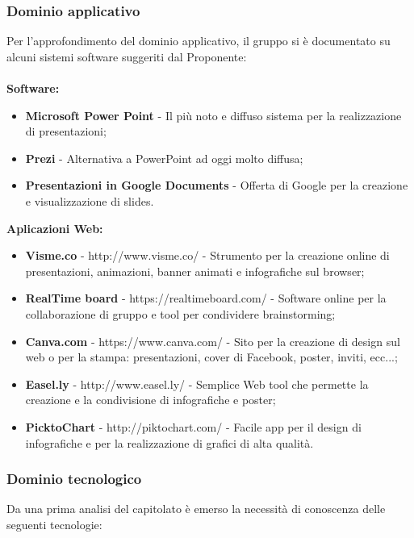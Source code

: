 \subsubsection{Dominio applicativo}
Per l’approfondimento del dominio applicativo, il gruppo si è documentato su alcuni sistemi software suggeriti dal Proponente:\\
\\
\textbf{Software:}
\begin{itemize}
	\item \textbf{Microsoft Power Point} - Il più noto e diffuso sistema per la realizzazione di presentazioni;
	\item \textbf{Prezi} - Alternativa a PowerPoint ad oggi molto diffusa;
	\item \textbf{Presentazioni in Google Documents} - Offerta di Google per la creazione e visualizzazione di slides.
\end{itemize}
\textbf{Aplicazioni Web:}
\begin{itemize}
	\item \textbf{Visme.co} - http://www.visme.co/ - Strumento per la creazione online di presentazioni, animazioni, banner animati e infografiche sul browser;
	\item \textbf{RealTime board} - https://realtimeboard.com/ - Software online per la collaborazione di gruppo e tool per condividere brainstorming;
	\item \textbf{Canva.com} - https://www.canva.com/ - Sito per la creazione di design sul web o per la stampa: presentazioni, cover di Facebook, poster, inviti, ecc...;
	\item \textbf{Easel.ly} - http://www.easel.ly/ - Semplice Web tool che permette la creazione e la condivisione di infografiche e poster;
	\item \textbf{PicktoChart} - http://piktochart.com/ - Facile app per il design di infografiche e per la realizzazione di grafici di alta qualità.
\end{itemize}

\subsubsection{Dominio tecnologico}

Da una prima analisi del capitolato è emerso la necessità di conoscenza delle seguenti tecnologie:

